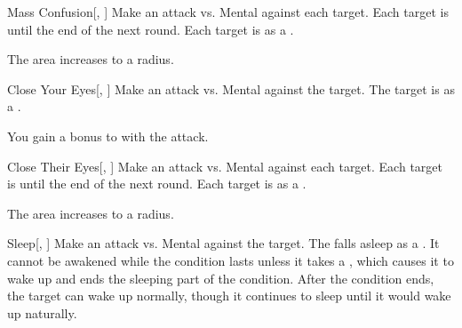 \lowercase{\hypertarget{spell:Mass Confusion}{}}\label{spell:Mass Confusion}
\begin{freeability}[Rank 5]{\hypertarget{spell:Mass Confusion}{Mass Confusion}}[, ]
Make an attack vs. Mental against each target.
\hit Each target is \confused until the end of the next round.
\crit Each target is  as a .

\rankline
{} The area increases to a \areamed radius.

\end{freeability}
\vspace{0.25em}



\lowercase{\hypertarget{spell:Close Your Eyes}{}}\label{spell:Close Your Eyes}
\begin{freeability}[Rank 6]{\hypertarget{spell:Close Your Eyes}{Close Your Eyes}}[, ]
Make an attack vs. Mental against the target.
\hit The target is  as a .

\rankline
{} You gain a  bonus to  with the attack.

\end{freeability}
\vspace{0.25em}



\lowercase{\hypertarget{spell:Close Their Eyes}{}}\label{spell:Close Their Eyes}
\begin{freeability}[Rank 7]{\hypertarget{spell:Close Their Eyes}{Close Their Eyes}}[, ]
Make an attack vs. Mental against each target.
\hit Each target is \blinded until the end of the next round.
\crit Each target is  as a .

\rankline
{} The area increases to a \areamed radius.

\end{freeability}
\vspace{0.25em}



\lowercase{\hypertarget{spell:Sleep}{}}\label{spell:Sleep}
\begin{freeability}[Rank 8]{\hypertarget{spell:Sleep}{Sleep}}[, ]
Make an attack vs. Mental against the target.
\hit The falls asleep as a .
It cannot be awakened while the condition lasts unless it takes a , which causes it to wake up and ends the sleeping part of the condition.
After the condition ends, the target can wake up normally, though it continues to sleep until it would wake up naturally.

\end{freeability}
\vspace{0.25em}



